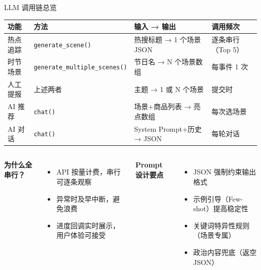 \documentclass[aspectratio=169, UTF8]{ctexbeamer}
\begin{document}
\begin{frame}{LLM 调用链总览}
  \begin{center}
    \begin{tabular}{l l l l}
      \toprule
      \textbf{功能} & \textbf{方法} & \textbf{输入 → 输出} & \textbf{调用频次} \\
      \midrule
      热点追踪 & \texttt{generate\_scene()}
        & 热搜标题 → 1 个场景 JSON & 逐条串行（Top 5）\\[4pt]
      时节场景 & \texttt{generate\_multiple\_scenes()}
        & 节日名 → N 个场景数组 & 每事件 1 次 \\[4pt]
      人工提报 & 上述两者
        & 主题 → 1 或 N 个场景 & 提交时 \\[4pt]
      AI 推荐 & \texttt{chat()}
        & 场景+商品列表 → 亮点数组 & 每次选场景 \\[4pt]
      AI 对话 & \texttt{chat()}
        & System Prompt+历史 → JSON & 每轮对话 \\
      \bottomrule
    \end{tabular}
  \end{center}

  \vspace{0.8em}
  \begin{columns}[T]
    \textbf{为什么全串行？}
    \begin{itemize}
      \item API 按量计费，串行可逐条观察
      \item 异常时及早中断，避免浪费
      \item 进度回调实时展示，用户体验可接受
    \end{itemize}
    \textbf{Prompt 设计要点}
    \begin{itemize}
      \item JSON 强制约束输出格式
      \item 示例引导（Few-shot）提高稳定性
      \item 关键词特异性规则（场景专属）
      \item 政治内容兜底（返空 JSON）
    \end{itemize}
  \end{columns}
\end{frame}
\end{document}
